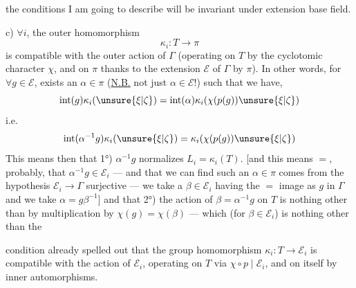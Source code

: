 

the conditions I am going to describe will be invariant under extension  base field.


c) \(\forall i\), the outer homomorphism
\[
\kappa_i:T\longrightarrow\pi
\]
is compatible with the outer action of \(\Gamma\) (operating on \(T\) by the
cyclotomic character \(\chi\), and on \(\pi\) thanks to the extension \(\mathcal E\)
of \(\Gamma\) by \(\pi\)). In other words, for \(\forall g\in\mathcal E\),
exists an \uline{\(\alpha\in\pi\)} (\uline{N.B.} not just
\(\alpha\in\mathcal E\)!) such that we have,
\[
\operatorname{int}(g)\kappa_i(\unsure{\xi|\zeta})
=\operatorname{int}(\alpha)\kappa_i(\chi(p(g))\unsure{\xi|\zeta})
\]
i.e.
\[
\operatorname{int}(\alpha^{-1}g)\kappa_i(\unsure{\xi|\zeta})
=\kappa_i(\chi(p(g))\unsure{\xi|\zeta})
\]
This means then that 1°) \(\alpha^{-1}g\) normalizes \(L_i=\kappa_i(T)\).
[and this means \(=\), probably, that \(\alpha^{-1}g\in\mathcal E_i\)
--- and that we can find such an \(\alpha\in\pi\)
 comes from the hypothesis
\(\mathcal E_i\to\Gamma\) surjective --- we take a \(\beta\in\mathcal E_i\)
 having the \(=\) image as \(g\) in \(\Gamma\)
and we take \(\alpha=g\beta^{-1}\)] and that 2°) the  action of
\(\beta=\alpha^{-1}g\) on \(T\) is nothing other than by multiplication
by \(\chi(g)=\chi(\beta)\) --- which (for \(\beta\in\mathcal E_i\)) is nothing other than the



condition already spelled out that the group homomorphism \(\kappa_i:T\to\mathcal E_i\)
is compatible with the action of \(\mathcal E_i\), operating on \(T\) via
\(\chi\circ p\mid\mathcal E_i\), and on itself by inner automorphisms.

